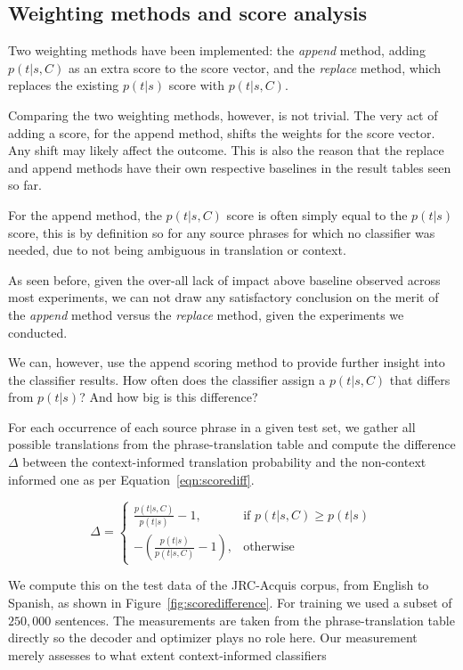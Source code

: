 \subsection{Weighting methods and score analysis}
\label{sec:weighting}

Two weighting methods have been implemented: the \emph{append} method, adding
$p(t|s,C)$ as an extra score to the score vector, and the \emph{replace}
method, which replaces the existing $p(t|s)$ score with $p(t|s,C)$.

Comparing the two weighting methods, however, is not trivial.  The very act of
adding a score, for the append method, shifts the weights for the score vector.
Any shift may likely affect the outcome. This is also the reason that the
replace and append methods have their own respective baselines in the result
tables seen so far.

For the append method, the $p(t|s,C)$ score is often simply
equal to the $p(t|s)$ score, this is by definition so for any source phrases for which no
classifier was needed, due to not being ambiguous in translation or context. 

As seen before, given the over-all lack of impact above baseline observed across most
experiments, we can not draw any satisfactory conclusion on the merit of the
\emph{append} method versus the \emph{replace} method, given the experiments we
conducted.

We can, however, use the append scoring method to provide further insight into
the classifier results. How often does the classifier assign a $p(t|s,C)$ that
differs from $p(t|s)$? And how big is this difference?

For each occurrence of each source phrase in a given test set, we gather all
possible translations from the phrase-translation table and compute the
difference $\Delta$ between the context-informed translation probability and
the non-context informed one as per Equation~\ref{eqn:scorediff}.

\begin{equation}
  \Delta = 
\begin{cases}
 \frac{p(t|s,C)}{p(t|s)} - 1, & \text{if } p(t|s,C) \geq p(t|s)  \\
 -(\frac{p(t|s)}{p(t|s,C)} - 1), & \text{otherwise}
\end{cases}
\label{eqn:scorediff}
\end{equation}


We compute this on the test data of the JRC-Acquis corpus,
from English to Spanish, as shown in Figure~\ref{fig:scoredifference}. For
training we used a subset of $250,000$ sentences. The measurements are taken
from the phrase-translation table directly so the decoder and optimizer plays
no role here. Our measurement merely assesses to what extent context-informed classifiers

